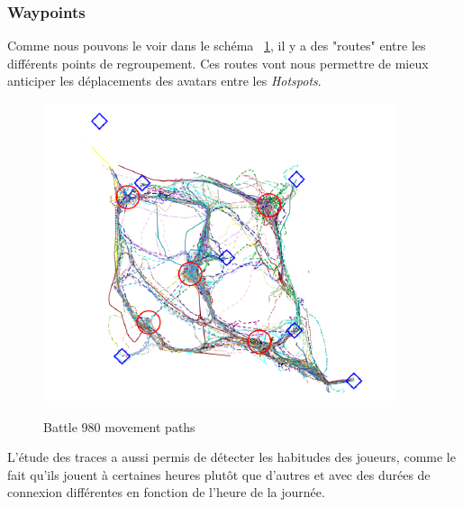 		\subsubsection{Waypoints}
	Comme nous pouvons le voir dans le schéma ~\ref{sch_trace}, il y a des "routes" entre les différents points de regroupement. Ces routes vont nous permettre de mieux anticiper les déplacements des avatars entre les \textit{Hotspots}.
        \vspace{1mm}
        \begin{figure}[!h]
        \centering
        \includegraphics[scale=0.65]{../Images/trace.png}\\
        \caption{Battle 980 movement paths}
        \label{sch_trace}
        \end{figure}	
        \vspace{1mm}
\newline
	L'étude des traces a aussi permis de détecter les habitudes des joueurs, comme le fait qu'ils jouent à certaines heures plutôt que d'autres et avec des durées de connexion différentes en fonction de l'heure de la journée.

\newpage
